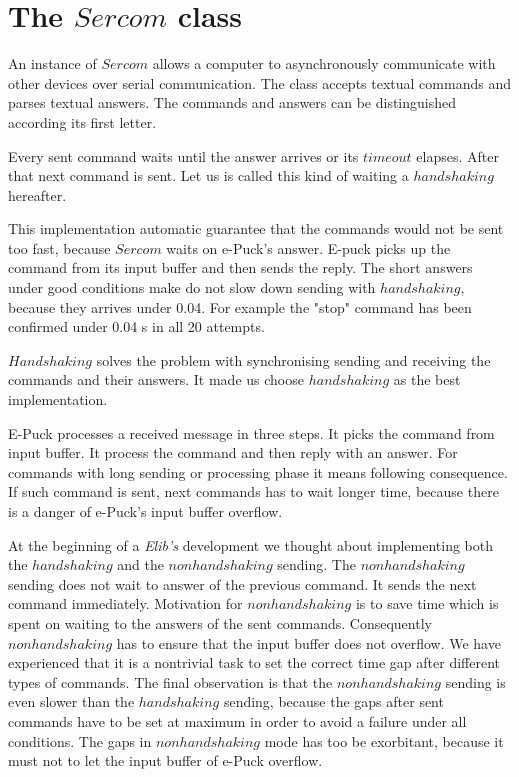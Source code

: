 \section{The $Sercom$ class}\label{sec:sercom}
  An instance of $Sercom$ allows a computer to asynchronously communicate with other devices
  over serial communication. The class accepts textual commands and parses textual answers.
  The commands and answers can be distinguished according its first letter.
  
  Every sent command waits until the answer arrives or its $timeout$ elapses.
  After that next command is sent. Let us is called this kind of waiting a $handshaking$ hereafter.

  This implementation automatic guarantee that the commands would not be sent too fast,
  because $Sercom$ waits on e-Puck's answer. E-puck picks up the command from its input buffer and then sends the reply.
  The short answers under good conditions make do not slow down sending with $handshaking$, because
  they arrives under 0.04. For example the "stop" command has been confirmed under 0.04 s in all 20 attempts.

  $Handshaking$ solves the problem with synchronising sending and receiving the commands and their answers. 
  It made us choose $handshaking$ as the best implementation.

  E-Puck processes a received message in three steps. It picks the command from input buffer.
  It process the command and then reply with an answer.
  For commands with long sending or processing phase it means following consequence.
  If such command is sent, next commands has to wait longer time, because there is a
  danger of e-Puck's input buffer overflow.

  At the beginning of a {\it Elib's} development we thought about implementing both the $handshaking$
  and the $nonhandshaking$ sending.
  The $nonhandshaking$ sending does not wait to answer of the previous command. It sends the next command immediately. 
  Motivation for $nonhandshaking$ is to save time which is spent on waiting to the answers of the sent commands.
  Consequently $nonhandshaking$ has to ensure that the input buffer does not overflow.
  We have experienced that it is a nontrivial task to set the correct time gap after different types of commands. 
  The final observation is that the $nonhandshaking$ sending is even slower than the $handshaking$ sending, 
  because the gaps after sent commands have to be set at maximum in order to avoid a failure under all conditions. 
  The gaps in $nonhandshaking$ mode has too be exorbitant, %
  because it must not to let the input buffer of e-Puck overflow.

